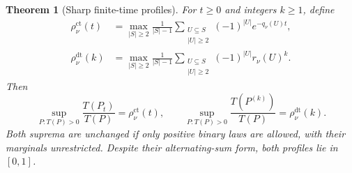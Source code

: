 \documentclass[11pt,a4paper]{article}
\newtheorem{theorem}{Theorem}[section]
\theoremstyle{definition}\newtheorem{definition}[theorem]{Definition}
\theoremstyle{remark}\newtheorem{remark}[theorem]{Remark}
\numberwithin{equation}{section}
\begin{document}
\begin{theorem}[Sharp finite-time profiles]\label{ext-reiwa-profiles}
For $t\geq0$ and integers $k\geq1$, define
\begin{align}
 \rho_{\nu}^{\mathrm{ct}}(t)
 &=\max_{|S|\geq2}\frac{1}{|S|-1}
   \sum_{\substack{U\subseteq S\\|U|\geq2}}
        (-1)^{|U|}e^{-q_\nu(U)t},
       \label{ext-reiwa-continuous-profile}\\
 \rho_{\nu}^{\mathrm{dt}}(k)
 &=\max_{|S|\geq2}\frac{1}{|S|-1}
   \sum_{\substack{U\subseteq S\\|U|\geq2}}
        (-1)^{|U|}r_\nu(U)^k.
       \label{ext-reiwa-discrete-profile}
\end{align}
Then
\[
 \sup_{P:T(P)>0}\frac{T(P_t)}{T(P)}
       =\rho_{\nu}^{\mathrm{ct}}(t),\qquad
 \sup_{P:T(P)>0}\frac{T(P^{(k)})}{T(P)}
       =\rho_{\nu}^{\mathrm{dt}}(k).
\]
Both suprema are unchanged if only positive binary laws are allowed,
with their marginals unrestricted.  Despite their alternating-sum
form, both profiles lie in $[0,1]$.
\end{theorem}
\end{document}
